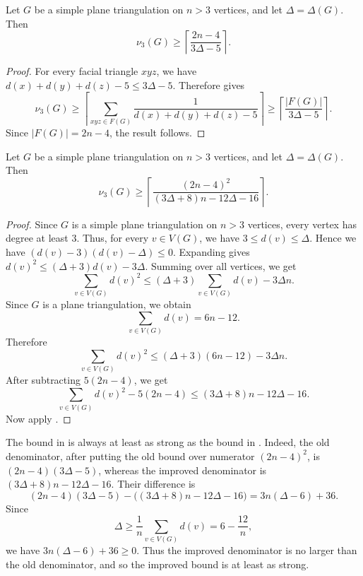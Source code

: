 \documentclass{patmorin}
\begin{document}
\begin{cor}\label{cor:old-delta-k3-packing}
Let $G$ be a simple plane triangulation on $n>3$ vertices, and let
$\Delta=\Delta(G)$. Then
\[
\nu_3(G)\ge
\left\lceil
\frac{2n-4}{3\Delta-5}
\right\rceil .
\]
\end{cor}

\begin{proof}
For every facial triangle $xyz$, we have  $d(x)+d(y)+d(z)-5\le 3\Delta-5$.
Therefore  gives
\[
\nu_3(G)
\ge
\left\lceil
\sum_{xyz\in F(G)}\frac{1}{d(x)+d(y)+d(z)-5}
\right\rceil
\ge
\left\lceil
\frac{|F(G)|}{3\Delta-5}
\right\rceil .
\]
Since $|F(G)|=2n-4$, the result follows.
\end{proof}

\begin{cor}\label{cor:improved-delta-k3-packing}
Let $G$ be a simple plane triangulation on $n>3$ vertices, and let
$\Delta=\Delta(G)$. Then
\[
\nu_3(G)\ge
\left\lceil
\frac{(2n-4)^2}
{(3\Delta+8)n-12\Delta-16}
\right\rceil .
\]
\end{cor}

\begin{proof}
Since $G$ is a simple plane triangulation on $n>3$ vertices, every vertex
has degree at least $3$. Thus, for every $v\in V(G)$, we have $3\le d(v)\le \Delta$.
Hence we have $(d(v)-3)(d(v)-\Delta)\le 0$.
Expanding gives $d(v)^2\le (\Delta+3)d(v)-3\Delta$.
Summing over all vertices, we get 
\[
\sum_{v\in V(G)}d(v)^2
\le
(\Delta+3)\sum_{v\in V(G)}d(v)-3\Delta n.
\]
Since $G$ is a plane triangulation, we obtain 
\[
\sum_{v\in V(G)}d(v)=6n-12.
\]
Therefore
\[
\sum_{v\in V(G)}d(v)^2
\le
(\Delta+3)(6n-12)-3\Delta n.
\]
After subtracting $5(2n-4)$, we get
\[
\sum_{v\in V(G)}d(v)^2-5(2n-4)
\le
(3\Delta+8)n-12\Delta-16.
\]
Now apply .
\end{proof}

\begin{rmk}
The bound in  is always at least as
strong as the bound in . Indeed, the old
denominator, after putting the old bound over numerator $(2n-4)^2$, is $(2n-4)(3\Delta-5)$,
whereas the improved denominator is $(3\Delta+8)n-12\Delta-16$.
Their difference is
\[
(2n-4)(3\Delta-5)-\bigl((3\Delta+8)n-12\Delta-16\bigr)
=
3n(\Delta-6)+36.
\]
Since
\[
\Delta\ge \frac{1}{n}\sum_{v\in V(G)}d(v)
=
6-\frac{12}{n},
\]
we have $3n(\Delta-6)+36\ge 0$.
Thus the improved denominator is no larger than the old denominator, and so the improved bound is at least as strong.
\end{rmk}
\end{document}

